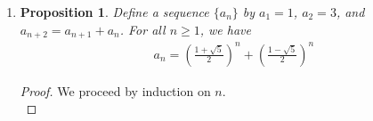 \documentclass{article}
\newtheorem{prop}[thm]{Proposition}
\begin{document}
\begin{enumerate}
\begin{proof}
    Suppose $1^2 + 2^2 + 3^2 + \ldots + n^2 = \frac{n(n+1)(2n+1)}{6}$ for some $n \in \mathbb{Z}^{+}$. \\
    We then have 
    \begin{align}
        \frac{(n+1)((n+1)+1)(2(n+1)+1)}{6} &= \frac{(n+1)(n+2)(2n+3)}{6} \\
                                           &= \frac{n(n+1)(2n+3)}{6} + \frac{2(n+1)(2n+3)}{6} \\
                                           &= \frac{n(n+1)(2n+1)}{6} + \frac{2n(n+1)}{6} + \frac{2(n+1)(2n+3)}{6} \\
                                           &= \frac{n(n+1)(2n+1)}{6} + \frac{6n^2+12n+6}{6} \\
                                           &= \frac{n(n+1)(2n+1)}{6} + n^2 + 2n + 1 \\
                                           &= \frac{n(n+1)(2n+1)}{6} + (n+1)^2 \\
                                           &= 1^2 + 2^2 + 3^2 + \ldots + n^2 + (n+1)^2 
    \end{align}
    Thus, the equation also work for $n + 1$ when $n$ works. \\
    Therefore, for all $n \in \mathbb{Z}^{+}$, 
    \begin{gather}
      1^2 + 2^2 + 3^2 + \ldots + n^2 = \frac{n(n+1)(2n+1)}{6}.
  \end{gather}
\end{proof}
    
\item 
\begin{prop}
    Define a sequence $\{a_n\}$ by $a_1 = 1$, $a_2 = 3$, and $a_{n+2} = a_{n+1} + a_n$. For all $n \geq 1$, we have 
    \begin{gather}
        a_n = \left(\frac{1 + \sqrt{5}}{2}\right)^n + \left(\frac{1 - \sqrt{5}}{2}\right)^n
    \end{gather}
\end{prop}
\begin{proof}
    We proceed by induction on $n$.\\
    

\end{proof}
\end{enumerate}
\end{document}
